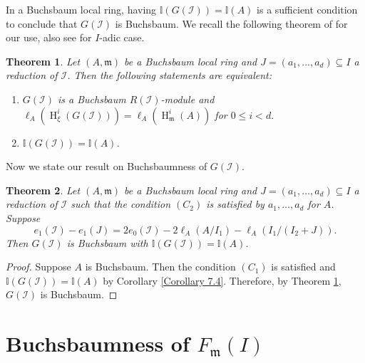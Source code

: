 \documentclass[11pt,reqno]{amsart}
\newtheorem{theorem}{Theorem}[section]
\theoremstyle{definition}
\newcommand{\m}{\mathfrak m}
\def\M{{\mathcal M}}
\def\I{{\mathcal I}}
\DeclareMathOperator{\h}{H}
\numberwithin{equation}{section}
\begin{document}
In a Buchsbaum local ring, having $\mathbb{I}(G(\I))=\mathbb{I}(A)$ is a sufficient condition to conclude that $G(\I)$ is Buchsbaum. We recall the following theorem  of \cite{sal20} for our use, also see \cite{ozeki13} for $I$-adic case. 
\begin{theorem}\cite[Theorem 1.2]{sal20}\label{theorem-of-sal20}
Let $(A,\m)$ be a Buchsbaum local ring and $J=(a_1,\ldots,a_d)\subseteq I$ a reduction of $\I$. Then the following statements are equivalent:
\begin{enumerate}
	\item $G(\I)$ is a Buchsbaum $R(\I)$-module and $\ell_A(\h^i_{\xi}(G(\I)))=\ell_A(\h^i_\m(A))$ for $0\leq i< d.$
	\item $\mathbb{I}(G(\I))=\mathbb{I}(A)$.
\end{enumerate}
\end{theorem}
Now we state our result on Buchsbaumness of $G(\I)$.
\begin{theorem}\label{m2}
	Let $(A,\m)$ be a Buchsbaum local ring and   $J=(a_1,\ldots,a_d)\subseteq I$ a reduction of $\I$  such that the condition $(C_2)$ is satisfied by $a_1,\ldots,a_d$ for $A$. Suppose \begin{equation*}e_1(\I)-e_1(J)=2e_0(\I)-2\ell_A(A/I_1)-\ell_A(I_1/(I_2+J)).
	\end{equation*} Then $G(\I)$ is Buchsbaum with $\mathbb{I}(G(\I))=\mathbb{I}(A)$.
\end{theorem}
\begin{proof}
	Suppose $A$ is Buchsbaum. Then the condition $(C_1)$ is satisfied and  $\mathbb{I}(G(\I))=\mathbb{I}(A)$ by Corollary \ref{Corollary 7.4}. Therefore,  by Theorem \ref{theorem-of-sal20}, $G(\I)$ is Buchsbaum.
\end{proof}
\section{\texorpdfstring
{Buchsbaumness of $F_{\m}(I)$}
{Buchsbaumness of Fm(I)}
}\label{Section-fiber-cone}
\end{document}
